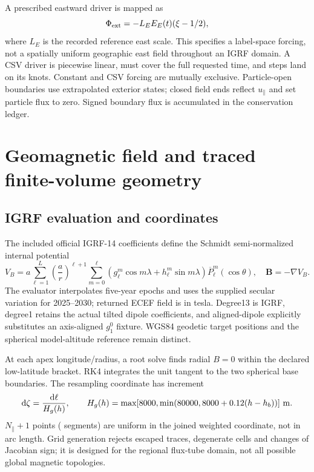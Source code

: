 A prescribed eastward driver is mapped as
\begin{equation}
 \Phi_{\rm ext}=-L_E E_E(t)(\xi-1/2),
\end{equation}
where $L_E$ is the recorded reference east scale. This specifies a label-space
forcing, not a spatially uniform geographic east field throughout an IGRF
domain. A CSV driver is piecewise linear, must cover the full requested time,
and steps land on its knots. Constant and CSV forcing are mutually exclusive.
Particle-open boundaries use extrapolated exterior states; closed field ends
reflect $u_\parallel$ and set particle flux to zero. Signed boundary flux is
accumulated in the conservation ledger.

\section{Geomagnetic field and traced finite-volume geometry}
\subsection{IGRF evaluation and coordinates}
The included official IGRF-14 coefficients define the Schmidt semi-normalized
internal potential \citep{IGRF14,NOAAIGRF}
\begin{equation}
 V_B=a\sum_{\ell=1}^{L}\left(\frac a r\right)^{\ell+1}
 \sum_{m=0}^\ell(g_\ell^m\cos m\lambda+h_\ell^m\sin m\lambda)
 \overline P_\ell^m(\cos\theta),\quad \bm B=-\nabla V_B.
\end{equation}
The evaluator interpolates five-year epochs and uses the supplied secular
variation for 2025--2030; returned ECEF field is in tesla. Degree13 is IGRF,
degree1 retains the actual tilted dipole coefficients, and aligned-dipole
explicitly substitutes an axis-aligned $g_1^0$ fixture. WGS84 geodetic target
positions and the spherical model-altitude reference remain distinct.

At each apex longitude/radius, a root solve finds radial $B=0$ within the
declared low-latitude bracket. RK4 integrates the unit tangent to the two
spherical base boundaries. The resampling coordinate has increment
\begin{equation}
 \mathrm d\zeta=\frac{\mathrm d\ell}{H_g(h)},\qquad
 H_g(h)=\max[8000,\min(80000,8000+0.12(h-h_b))]\ {\rm m}.
\end{equation}
$N_\parallel+1$ points ( segments) are uniform in the joined weighted coordinate, not in arc
length. Grid generation rejects escaped traces, degenerate cells and changes
of Jacobian sign; it is designed for the regional flux-tube domain, not all
possible global magnetic topologies.

